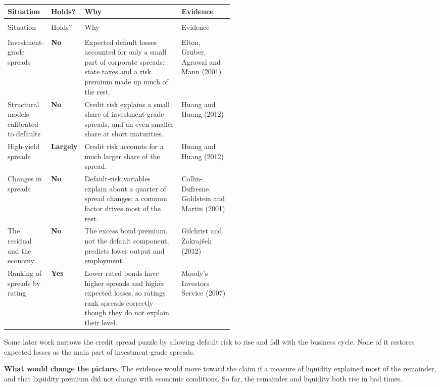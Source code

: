 {\small
\begin{longtable}{@{}>{\raggedright\arraybackslash}p{0.19\linewidth}>{\raggedright\arraybackslash}p{0.10\linewidth}>{\raggedright\arraybackslash}p{}>{\raggedright\arraybackslash}p{0.23\linewidth}@{}}
\toprule
Situation & Holds? & Why & Evidence \\
\midrule
\endfirsthead
\multicolumn{4}{@{}l}{\emph{(continued)}} \\
\toprule
Situation & Holds? & Why & Evidence \\
\midrule
\endhead
\midrule
\multicolumn{4}{r@{}}{\emph{(continued on the next page)}} \\
\endfoot
\bottomrule
\endlastfoot
Investment-grade spreads & \textbf{No} & Expected default losses accounted for only a small part of corporate spreads; state taxes and a risk premium made up much of the rest. & Elton, Gruber, Agrawal and Mann (2001) \\
\addlinespace[3pt]
Structural models calibrated to defaults & \textbf{No} & Credit risk explains a small share of investment-grade spreads, and an even smaller share at short maturities. & Huang and Huang (2012) \\
\addlinespace[3pt]
High-yield spreads & \textbf{Largely} & Credit risk accounts for a much larger share of the spread. & Huang and Huang (2012) \\
\addlinespace[3pt]
Changes in spreads & \textbf{No} & Default-risk variables explain about a quarter of spread changes; a common factor drives most of the rest. & Collin-Dufresne, Goldstein and Martin (2001) \\
\addlinespace[3pt]
The residual and the economy & \textbf{No} & The excess bond premium, not the default component, predicts lower output and employment. & Gilchrist and Zakraj\v{s}ek (2012) \\
\addlinespace[3pt]
Ranking of spreads by rating & \textbf{Yes} & Lower-rated bonds have higher spreads and higher expected losses, so ratings rank spreads correctly though they do not explain their level. & Moody's Investors Service (2007) \\
\end{longtable}
}

Some later work narrows the credit spread puzzle by allowing default risk to rise and fall with the business cycle. None of it restores expected losses as the main part of investment-grade spreads.

\textbf{What would change the picture.} The evidence would move toward the claim if a measure of liquidity explained most of the remainder, and that liquidity premium did not change with economic conditions. So far, the remainder and liquidity both rise in bad times.

